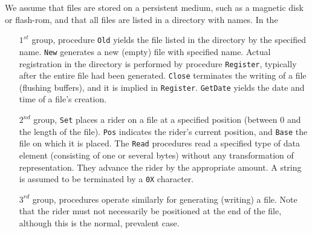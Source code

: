 We assume that files are stored on a persistent medium, such as a magnetic disk or flash-rom,
and that all files are listed in a directory with names. In the
\begin{itemize}
  \item[$1^{st}$] group, procedure \verb|Old| yields the file listed in the directory by
    the specified name. \verb|New| generates a new (empty) file with specified name.
    Actual registration in the directory is performed by procedure \verb|Register|,
    typically after the entire file had been generated. \verb|Close| terminates the writing
    of a file (flushing buffers), and it is implied in \verb|Register|. \verb|GetDate|
    yields the date and time of a file’s creation.
  \item[$2^{nd}$] group, \verb|Set| places a rider on a file at a specified position
    (between $0$ and the length of the file). \verb|Pos| indicates the rider's current
    position, and \verb|Base| the file on which it is placed. The \verb|Read| procedures
    read a specified type of data element (consisting of one or several bytes) without any
    transformation of representation. They advance the rider by the appropriate amount.
    A string is assumed to be terminated by a \verb|0X| character.
  \item[$3^{rd}$] group, procedures operate similarly for generating (writing) a file.
    Note that the rider must not necessarily be positioned at the end of the file,
    although this is the normal, prevalent case.
\end{itemize}

